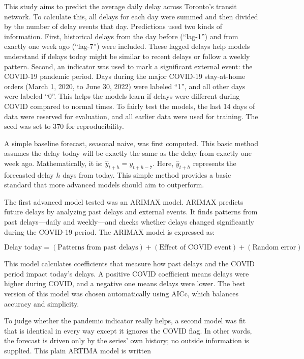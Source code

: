 \documentclass[
]{article}
\begin{document}
This study aims to predict the average daily delay across Toronto's
transit network. To calculate this, all delays for each day were summed
and then divided by the number of delay events that day. Predictions
used two kinds of information. First, historical delays from the day
before (``lag-1'') and from exactly one week ago (``lag-7'') were
included. These lagged delays help models understand if delays today
might be similar to recent delays or follow a weekly pattern. Second, an
indicator was used to mark a significant external event: the COVID-19
pandemic period. Days during the major COVID-19 stay-at-home orders
(March 1, 2020, to June 30, 2022) were labeled ``1'', and all other days
were labeled ``0''. This helps the models learn if delays were different
during COVID compared to normal times. To fairly test the models, the
last 14 days of data were reserved for evaluation, and all earlier data
were used for training. The seed was set to 370 for reproducibility.

A simple baseline forecast, seasonal naive, was first computed. This
basic method assumes the delay today will be exactly the same as the
delay from exactly one week ago. Mathematically, it is:
\(\widehat{y}_{t+h} = y_{t+h-7}\). Here, \(\widehat{y}_{t+h}\)
represents the forecasted delay \(h\) days from today. This simple
method provides a basic standard that more advanced models should aim to
outperform.

The first advanced model tested was an ARIMAX model. ARIMAX predicts
future delays by analyzing past delays and external events. It finds
patterns from past delays---daily and weekly---and checks whether delays
changed significantly during the COVID-19 period. The ARIMAX model is
expressed as:

\[
\text{Delay today} = (\text{Patterns from past delays}) + (\text{Effect of COVID event}) + (\text{Random error})
\]

This model calculates coefficients that measure how past delays and the
COVID period impact today's delays. A positive COVID coefficient means
delays were higher during COVID, and a negative one means delays were
lower. The best version of this model was chosen automatically using
AICc, which balances accuracy and simplicity.

To judge whether the pandemic indicator really helps, a second model was
fit that is identical in every way except it ignores the COVID flag. In
other words, the forecast is driven only by the series' own history; no
outside information is supplied. This plain ARTIMA model is written
\end{document}
